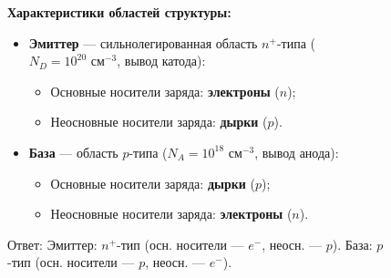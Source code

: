 \documentclass[12pt,a4paper]{article}
\theoremstyle{plain}
\theoremstyle{definition}
\theoremstyle{remark}
\numberwithin{equation}{section}
\begin{document}
\begin{figure}[H]
\begin{minipage}[t]{0.7\textwidth}
\begin{minipage}[t]{0.95\textwidth}

            \vspace{0.8em}
            \raggedright
            \textbf{Характеристики областей структуры:}
            \begin{itemize}
                \item \textbf{Эмиттер} --- сильнолегированная область $n^+$-типа ($N_D = 10^{20}\text{ см}^{-3}$, вывод катода):
                \begin{itemize}
                    \item Основные носители заряда: \textbf{электроны} ($n$);
                    \item Неосновные носители заряда: \textbf{дырки} ($p$).
                \end{itemize}
                \item \textbf{База} --- область $p$-типа ($N_A = 10^{18}\text{ см}^{-3}$, вывод анода):
                \begin{itemize}
                    \item Основные носители заряда: \textbf{дырки} ($p$);
                    \item Неосновные носители заряда: \textbf{электроны} ($n$).
                \end{itemize}
            \end{itemize}

            \vspace{0.4em}
            Ответ: Эмиттер: $n^+$-тип (осн. носители --- $e^-$, неосн. --- $p$). База: $p$-тип (осн. носители --- $p$, неосн. --- $e^-$).
    \end{minipage}\end{minipage}
\end{figure}
\end{document}
